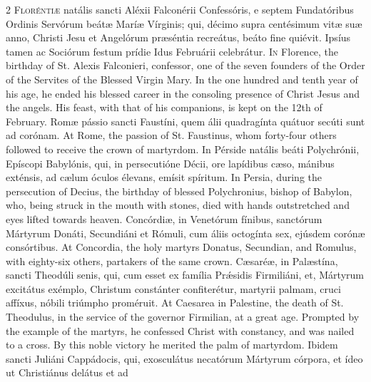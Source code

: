 \begin{paracol}{2}
\lettrine[lines=2]{F}{loréntiæ} natális sancti Aléxii Falconérii 
 Confessóris, e septem Fundatóribus Ordinis Servórum beátæ Maríæ Vírginis; 
 qui, décimo supra centésimum vitæ suæ anno, Christi Jesu et Angelórum 
 præséntia recreátus, beáto fine quiévit. Ipsíus tamen ac Sociórum 
 festum prídie Idus Februárii celebrátur.
\switchcolumn
{}
\lettrine[lines=2]{I}{n} Florence, the birthday of St. Alexis Falconieri, confessor, one of the 
 seven founders of the Order of the Servites of the Blessed Virgin Mary. 
 In the one hundred and tenth year of his age, he ended his blessed career in 
 the consoling presence of Christ Jesus and the angels. His feast, with 
 that of his companions, is kept on the 12th of February.
\switchcolumn*
{}
Romæ pássio sancti Faustíni, quem álii 
 quadragínta quátuor secúti sunt ad corónam.
\switchcolumn
{}
At Rome, the passion of St. Faustinus, whom forty-four others followed to 
 receive the crown of martyrdom.
\switchcolumn*
{}
In Pérside natális beáti Polychrónii, Epíscopi Babylónis, qui, in 
 persecutióne Décii, ore lapídibus cæso, mánibus 
 exténsis, ad cælum óculos élevans, emísit spíritum.
\switchcolumn
{}
In Persia, during the persecution of Decius, the birthday of blessed 
 Polychronius, bishop of Babylon, who, being struck in the mouth with stones, 
 died with hands outstretched and eyes lifted towards heaven.
\switchcolumn*
{}
Concórdiæ, in Venetórum fínibus, sanctórum 
 Mártyrum Donáti, Secundiáni et Rómuli, cum áliis octogínta sex, ejúsdem 
 corónæ consórtibus.
\switchcolumn
{}
At Concordia, the holy martyrs Donatus, Secundian, and Romulus, with 
 eighty-six others, partakers of the same crown.
\switchcolumn*
{}
Cæsaréæ, in Palæstína, sancti Theodúli senis, 
 qui, cum esset ex família Prǽsidis Firmiliáni, et, Mártyrum excitátus 
 exémplo, Christum constánter confiterétur, martyrii palmam, cruci affíxus, 
 nóbili triúmpho proméruit.
\switchcolumn
{}
At Caesarea in Palestine, the death of St. Theodulus, in the service of the 
 governor Firmilian, at a great age. Prompted by the example of the 
 martyrs, he confessed Christ with constancy, and was nailed to a cross. 
 By this noble victory he merited the palm of martyrdom.
\switchcolumn*
{}
Ibidem sancti Juliáni Cappádocis, qui, 
 exosculátus necatórum Mártyrum córpora, et ídeo ut Christiánus delátus et ad 

\end{paracol}
